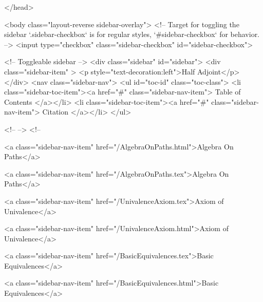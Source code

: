 </head>


  <body class="layout-reverse sidebar-overlay">
    <!-- Target for toggling the sidebar `.sidebar-checkbox` is for regular
     styles, `#sidebar-checkbox` for behavior. -->
<input type="checkbox" class="sidebar-checkbox" id="sidebar-checkbox">

<!-- Toggleable sidebar -->
<div class="sidebar" id="sidebar">
  <div class="sidebar-item" >
    <p style="text-decoration:left">Half Adjoint</p>
  </div>
  <nav class="sidebar-nav">
    <ul id="toc-id" class="toc-class">
  <li class="sidebar-toc-item"><a href="#" class="sidebar-nav-item"> Table of Contents </a></li>
  <li class="sidebar-toc-item"><a href="#" class="sidebar-nav-item"> Citation </a></li>
</ul>


    <!--  -->
    <!-- 
      
    
      
    
      
    
      
    
      
        
      
    
      
        
          <a class="sidebar-nav-item" href="/AlgebraOnPaths.html">Algebra On Paths</a>
        
      
    
      
        
          <a class="sidebar-nav-item" href="/AlgebraOnPaths.tex">Algebra On Paths</a>
        
      
    
      
        
          <a class="sidebar-nav-item" href="/UnivalenceAxiom.tex">Axiom of Univalence</a>
        
      
    
      
        
          <a class="sidebar-nav-item" href="/UnivalenceAxiom.html">Axiom of Univalence</a>
        
      
    
      
        
          <a class="sidebar-nav-item" href="/BasicEquivalences.tex">Basic Equivalences</a>
        
      
    
      
        
          <a class="sidebar-nav-item" href="/BasicEquivalences.html">Basic Equivalences</a>
        
      
    
